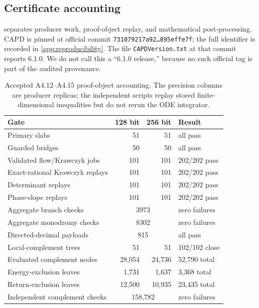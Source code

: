 \subsection{Certificate accounting}

 separates producer work, proof-object
replay, and mathematical post-processing.  CAPD is pinned at official
commit \texttt{731079217a92\ldots895effe7f}; the full identifier is recorded
in \cref{app:reproducibility}.  The file \texttt{CAPDVersion.txt} at that
commit reports 6.1.0.  We do not call this a
``6.1.0 release,'' because no such official tag is part of the audited
provenance.

\begin{table}[t]
\centering
\caption{Accepted A4.12--A4.15 proof-object accounting.  The precision
columns are producer replicas; the independent scripts replay stored
finite-dimensional inequalities but do not rerun the ODE integrator.}
\label{tab:certificate-accounting}
\small
\begin{tabular}{@{}p{}rrp{}@{}}
\toprule
Gate & 128 bit & 256 bit & Result\\
\midrule
Primary slabs & 51 & 51 & all pass\\
Guarded bridges & 50 & 50 & all pass\\
Validated flow/Krawczyk jobs & 101 & 101 & 202/202 pass\\
Exact-rational Krawczyk replays & 101 & 101 & 202/202 pass\\
Determinant replays & 101 & 101 & 202/202 pass\\
Phase-slope replays & 101 & 101 & 202/202 pass\\
Aggregate branch checks & \multicolumn{2}{c}{3973} & zero failures\\
Aggregate monodromy checks & \multicolumn{2}{c}{8302} & zero failures\\
Directed-decimal payloads & \multicolumn{2}{c}{815} & all pass\\
Local-complement trees & 51 & 51 & 102/102 close\\
Evaluated complement nodes & 28,054 & 24,736 & 52,790 total\\
Energy-exclusion leaves & 1,731 & 1,637 & 3,368 total\\
Return-exclusion leaves & 12,500 & 10,935 & 23,435 total\\
Independent complement checks & \multicolumn{2}{c}{158,782} & zero failures\\
\bottomrule
\end{tabular}
\end{table}

